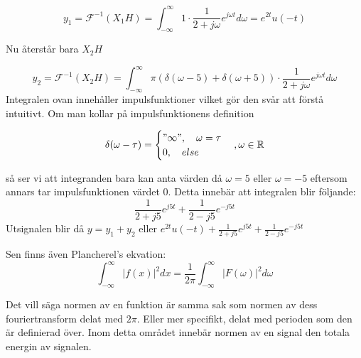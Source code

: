 \documentclass{article}
\begin{document}
\begin{displaymath}
  y_1 = \mathcal{F}^{-1}(X_1 H)
  = \int_{-\infty}^{\infty} 1 \cdot \frac{1}{2+j \omega} e^{j \omega t} d\omega
  = e^{2 t} u(-t)
\end{displaymath}

Nu återstår bara $X_2 H$

\begin{displaymath}
  y_2=\mathcal{F}^{-1}(X_2 H) = \int_{-\infty}^{\infty} \pi(\delta(\omega - 5)
  + \delta(\omega + 5)) \cdot \frac{1}{2+j \omega} e^{j \omega t} d\omega
\end{displaymath}
Integralen ovan innehåller impulsfunktioner vilket gör den svår att förstå
intuitivt. Om man kollar på impulsfunktionens definition

\begin{displaymath}
\delta(\omega - \tau)=
\begin{cases}
"\infty",\quad \omega = \tau \\
0, \quad else
\end{cases}, \omega \in \mathbb{R}
\end{displaymath}

så ser vi att integranden bara kan anta värden då $\omega=5$ eller $\omega =-5$
eftersom annars tar impulsfunktionen värdet 0.
Detta innebär att integralen blir följande:
\begin{displaymath}
  \frac{1}{2+j 5} e^{j 5 t} + \frac{1}{2-j 5} e^{-j 5 t}
\end{displaymath}
Utsignalen blir då $y=y_1 + y_2$ eller
$e^{2 t} u(-t) + \frac{1}{2+j 5} e^{j 5 t} + \frac{1}{2-j 5} e^{-j 5 t}$

Sen finns även Plancherel's ekvation: %
\begin{displaymath}
  \int_{-\infty}^{\infty} |f(x)|^2 dx =
  \frac{1}{2 \pi}\int_{-\infty}^{\infty} |F(\omega)|^2 d\omega
\end{displaymath}

Det vill säga normen av en funktion är samma sak som normen av dess
fouriertransform delat med $2 \pi$. Eller mer specifikt, delat med perioden
som den är definierad över. Inom detta området innebär normen av en signal den
totala energin av signalen.
\end{document}
